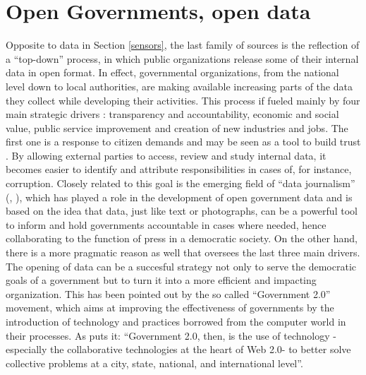 \documentclass[12pt]{article}
\begin{document}
\section{Open Governments, open data}
\label{gov}
Opposite to data in Section \ref{sensors}, the last family of sources is the
reflection of a ``top-down'' process, in which public
organizations release some of their internal data in open format.
In effect, governmental organizations, from the national
level down to local
authorities, are making available increasing parts of the data they collect
while developing their activities. 
This process if fueled mainly by four main strategic drivers
\citep{datagovukslides}: transparency and accountability, economic and social
value, public service improvement and creation of new industries and jobs.
The first one is a response to citizen demands and may be seen as a tool to build trust
\citep{opendatawp}. By allowing external parties to access,
review and study internal data, it becomes easier to identify and attribute
responsibilities in cases of, for instance, corruption. Closely related to this
goal is the emerging field of ``data journalism'' (\citealp{sacredfacts},
\citealp{djhb2012}), which has played a role in the development of open
government data and is based on the idea that data, just like text or photographs, can be
a powerful tool to inform and hold governments accountable
in cases where needed, hence collaborating to the function of 
press in a democratic society.
On the other hand, there is a more pragmatic reason as well that oversees the
last three main drivers. The opening of data can be a succesful strategy not
only to serve the democratic goals of a government but to turn
it into a more efficient and impacting organization. This has been
pointed out by the so called ``Government 2.0'' movement, which aims at
improving the effectiveness of governments by the introduction of
technology and practices borrowed from the computer world in their processes.
As \cite{govplatform2010} puts it: ``Government 2.0, then, is the use of
technology -especially the collaborative technologies at the heart of Web
2.0- to better solve collective problems at a city, state, national, and
international level''.
\end{document}
